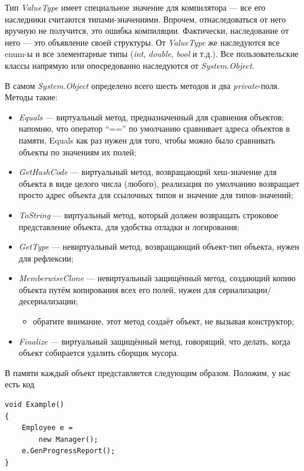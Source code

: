 \documentclass[a5paper]{article}
\begin{document}
Тип \textit{ValueType} имеет специальное значение для компилятора --- все его наследники считаются типами-значениями. Впрочем, отнаследоваться от него вручную не получится, это ошибка компиляции. Фактически, наследование от него --- это объявление своей структуры. От \textit{ValueType} же наследуются все enum-ы и все элементарные типы (\textit{int}, \textit{double}, \textit{bool} и т.д.). Все пользовательские классы напрямую или опосредованно наследуются от \textit{System.Object}.

В самом \textit{System.Object} определено всего шесть методов и два \textit{private}-поля. Методы такие:

\begin{itemize}
	\item \textit{Equals} --- виртуальный метод, предназначенный для сравнения объектов; напомню, что оператор ``=='' по умолчанию сравнивает адреса объектов в памяти, Equals как раз нужен для того, чтобы можно было сравнивать объекты по значениям их полей;
	\item \textit{GetHashCode} --- виртуальный метод, возвращающий хеш-значение для объекта в виде целого числа (любого), реализация по умолчанию возвращает просто адрес объекта для ссылочных типов и значение для типов-значений;
	\item \textit{ToString} --- виртуальный метод, который должен возвращать строковое представление объекта, для удобства отладки и логирования;
	\item \textit{GetType} --- невиртуальный метод, возвращающий объект-тип объекта, нужен для рефлексии;
	\item \textit{MemberwiseClone} --- невиртуальный защищённый метод, создающий копию объекта путём копирования всех его полей, нужен для сериализации/десериализации;
	\begin{itemize}
		\item обратите внимание, этот метод создаёт объект, не вызывая конструктор;
	\end{itemize}
	\item \textit{Finalize} --- виртуальный защищённый метод, говорящий, что делать, когда объект собирается удалить сборщик мусора.
\end{itemize}

В памяти каждый объект представляется следующим образом. Положим, у нас есть код

\begin{verbatim}
void Example() 
{
    Employee e = 
        new Manager();
    e.GenProgressReport();
}
\end{verbatim}
\end{document}
